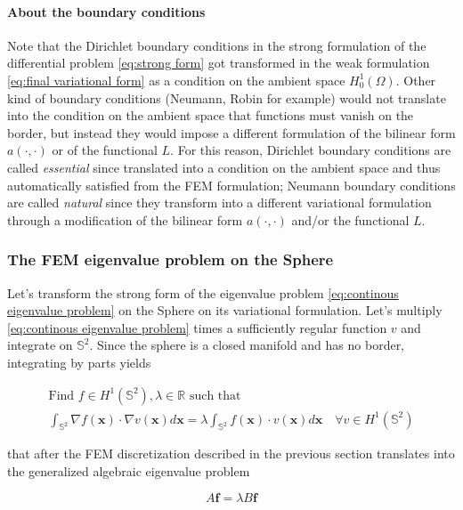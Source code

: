 \paragraph{About the boundary conditions}
	Note that the Dirichlet boundary conditions in the strong formulation of the differential problem \ref{eq:strong form} got transformed in the weak formulation \ref{eq:final variational form} as a condition on the ambient space $H_0^1(\Omega)$. Other kind of boundary conditions (Neumann, Robin for example) would not translate into the condition on the ambient space that functions must vanish on the border, but instead they would impose a different formulation of the bilinear form $a(\cdot, \cdot)$ or of the functional $L$. For this reason, Dirichlet boundary conditions are called \textit{essential} since translated into a condition on the ambient space and thus automatically satisfied from the FEM formulation; Neumann boundary conditions are called \textit{natural} since they transform into a different variational formulation through a modification of the bilinear form $a(\cdot, \cdot)$ and/or the functional $L$.



\subsubsection{The FEM eigenvalue problem on the Sphere}
Let's transform the strong form of the eigenvalue problem \ref{eq:continous eigenvalue problem} on the Sphere on its variational formulation. Let's multiply \ref{eq:continous eigenvalue problem} times a sufficiently regular function $v$ and integrate on $\mathbb S^2$. Since the sphere is a closed manifold and has no border, integrating by parts yields

\begin{align}\label{eq:weak eigenvalue problem}
\text{Find } f\in H^1(\mathbb S^2), \lambda\in\mathbb R\text{ such that }\\ 
\int_{\mathbb S^2} \nabla f(\mathbf x)\cdot\nabla v(\mathbf x) d\mathbf x = \lambda \int_{\mathbb S^2} f(\mathbf x)\cdot v(\mathbf x)d\mathbf x\quad \forall v\in H^1(\mathbb S^2)
\end{align}

that after the FEM discretization described in the previous section translates into the generalized algebraic eigenvalue problem

\begin{equation}\label{eq:algebraic generalized eigenvalue problem}
	A\mathbf f = \lambda B \mathbf f
\end{equation}

